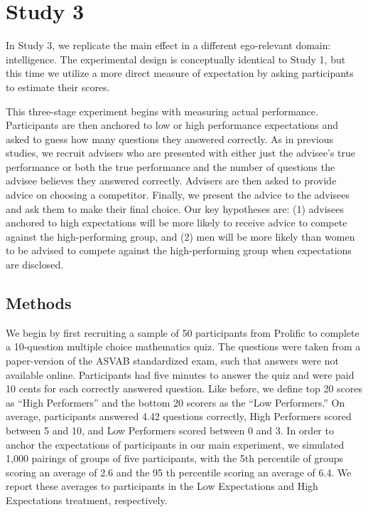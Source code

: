 \documentclass[
  man,
  floatsintext,
  longtable,
  nolmodern,
  notxfonts,
  notimes,
  colorlinks=true,linkcolor=blue,citecolor=blue,urlcolor=blue]{apa7}
\begin{document}
\section{Study 3}\label{study-3}

In Study 3, we replicate the main effect in a different ego-relevant
domain: intelligence. The experimental design is conceptually identical
to Study 1, but this time we utilize a more direct measure of
expectation by asking participants to estimate their scores.

This three-stage experiment begins with measuring actual performance.
Participants are then anchored to low or high performance expectations
and asked to guess how many questions they answered correctly. As in
previous studies, we recruit advisers who are presented with either just
the advisee's true performance or both the true performance and the
number of questions the advisee believes they answered correctly.
Advisers are then asked to provide advice on choosing a competitor.
Finally, we present the advice to the advisees and ask them to make
their final choice. Our key hypotheses are: (1) advisees anchored to
high expectations will be more likely to receive advice to compete
against the high-performing group, and (2) men will be more likely than
women to be advised to compete against the high-performing group when
expectations are disclosed.

\subsection{Methods}\label{methods-2}

We begin by first recruiting a sample of 50 participants from Prolific
to complete a 10-question multiple choice mathematics quiz. The
questions were taken from a paper-version of the ASVAB standardized
exam, such that answers were not available online. Participants had five
minutes to answer the quiz and were paid 10 cents for each correctly
answered question. Like before, we define top 20 scores as ``High
Performers'' and the bottom 20 scorers as the ``Low Performers.'' On
average, participants answered 4.42 questions correctly, High Performers
scored between 5 and 10, and Low Performers scored between 0 and 3. In
order to anchor the expectations of participants in our main experiment,
we simulated 1,000 pairings of groups of five participants, with the 5th
percentile of groups scoring an average of 2.6 and the 95 th percentile
scoring an average of 6.4. We report these averages to participants in
the Low Expectations and High Expectations treatment, respectively.
\end{document}
